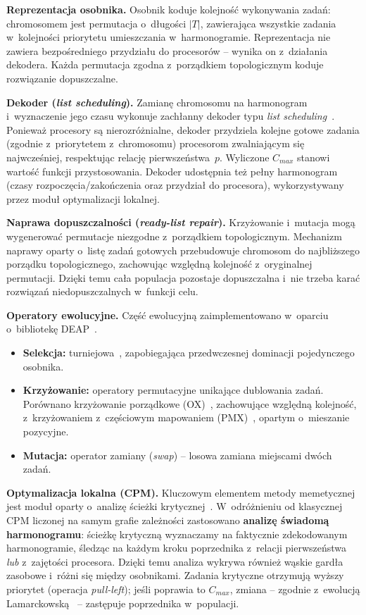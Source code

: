 \documentclass[12pt,a4paper]{article}
\newcommand{\h}[1]{\par\medskip\noindent\textbf{#1}}
\begin{document}
\h{Reprezentacja osobnika.} Osobnik koduje kolejność wykonywania zadań: chromosomem jest
permutacja o~długości $|T|$, zawierająca wszystkie zadania w~kolejności priorytetu umieszczania
w~harmonogramie. Reprezentacja nie zawiera bezpośredniego przydziału do procesorów -- wynika on
z~działania dekodera. Każda permutacja zgodna z~porządkiem topologicznym koduje rozwiązanie
dopuszczalne.

\h{Dekoder (\textit{list scheduling}).} Zamianę chromosomu na harmonogram i~wyznaczenie jego czasu
wykonuje zachłanny dekoder typu \textit{list scheduling}~\cite{graham1969}. Ponieważ procesory są
nierozróżnialne, dekoder przydziela kolejne gotowe zadania (zgodnie z~priorytetem z~chromosomu)
procesorom zwalniającym się najwcześniej, respektując relację pierwszeństwa~$p$. Wyliczone $C_{max}$
stanowi wartość funkcji przystosowania. Dekoder udostępnia też pełny harmonogram (czasy
rozpoczęcia/zakończenia oraz przydział do procesora), wykorzystywany przez moduł optymalizacji
lokalnej.

\h{Naprawa dopuszczalności (\textit{ready-list repair}).} Krzyżowanie i~mutacja mogą wygenerować
permutacje niezgodne z~porządkiem topologicznym. Mechanizm naprawy oparty o~listę zadań gotowych
przebudowuje chromosom do najbliższego porządku topologicznego, zachowując względną kolejność
z~oryginalnej permutacji. Dzięki temu cała populacja pozostaje dopuszczalna i~nie trzeba karać
rozwiązań niedopuszczalnych w~funkcji celu.

\h{Operatory ewolucyjne.} Część ewolucyjną zaimplementowano w~oparciu o~bibliotekę
DEAP~\cite{deap2012}.
\begin{itemize}[itemsep=3pt, topsep=3pt]
    \item \textbf{Selekcja:} turniejowa~\cite{miller1995}, zapobiegająca przedwczesnej dominacji pojedynczego osobnika.
    \item \textbf{Krzyżowanie:} operatory permutacyjne unikające dublowania zadań. Porównano krzyżowanie porządkowe (OX)~\cite{davis1985}, zachowujące względną kolejność, z~krzyżowaniem z~częściowym mapowaniem (PMX)~\cite{goldberg1985}, opartym o~mieszanie pozycyjne.
    \item \textbf{Mutacja:} operator zamiany (\textit{swap}) -- losowa zamiana miejscami dwóch zadań.
\end{itemize}

\h{Optymalizacja lokalna (CPM).} Kluczowym elementem metody memetycznej jest moduł oparty o~analizę
ścieżki krytycznej~\cite{kelley1959}. W~odróżnieniu od klasycznej CPM liczonej na samym grafie
zależności zastosowano \textbf{analizę świadomą harmonogramu}: ścieżkę krytyczną wyznaczamy na
faktycznie zdekodowanym harmonogramie, śledząc na każdym kroku poprzednika z~relacji pierwszeństwa
\emph{lub} z~zajętości procesora. Dzięki temu analiza wykrywa również wąskie gardła zasobowe
i~różni się między osobnikami. Zadania krytyczne otrzymują wyższy priorytet (operacja
\textit{pull-left}); jeśli poprawia to $C_{max}$, zmiana -- zgodnie z~ewolucją
Lamarckowską~\cite{whitley1994} -- zastępuje poprzednika w~populacji.
\end{document}
